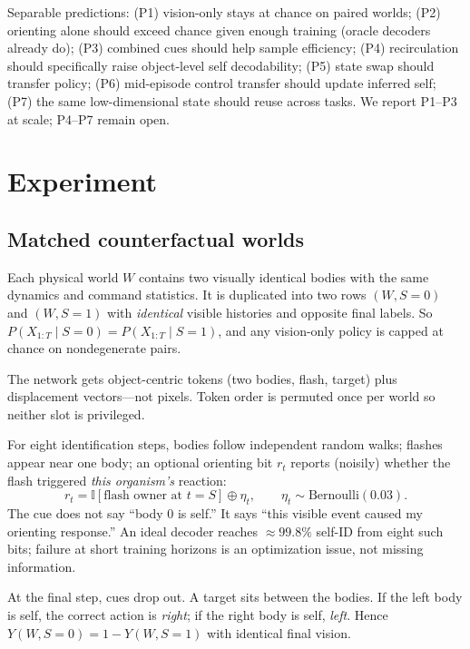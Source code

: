 \documentclass[11pt]{article}
\newcommand{\I}{\mathbb{I}}
\begin{document}
Separable predictions: (P1) vision-only stays at chance on paired worlds; (P2) orienting alone should exceed chance given enough training (oracle decoders already do); (P3) combined cues should help sample efficiency; (P4) recirculation should specifically raise object-level self decodability; (P5) state swap should transfer policy; (P6) mid-episode control transfer should update inferred self; (P7) the same low-dimensional state should reuse across tasks. We report P1--P3 at scale; P4--P7 remain open.

\section{Experiment}

\subsection{Matched counterfactual worlds}

Each physical world $W$ contains two visually identical bodies with the same dynamics and command statistics. It is duplicated into two rows $(W,S=0)$ and $(W,S=1)$ with \emph{identical} visible histories and opposite final labels. So $P(X_{1:T}\mid S=0)=P(X_{1:T}\mid S=1)$, and any vision-only policy is capped at chance on nondegenerate pairs.

The network gets object-centric tokens (two bodies, flash, target) plus displacement vectors---not pixels. Token order is permuted once per world so neither slot is privileged.

For eight identification steps, bodies follow independent random walks; flashes appear near one body; an optional orienting bit $r_t$ reports (noisily) whether the flash triggered \emph{this organism's} reaction:
\begin{equation}
r_t = \I[\text{flash owner at }t=S]\oplus\eta_t, \qquad \eta_t\sim\mathrm{Bernoulli}(0.03).
\end{equation}
The cue does not say ``body 0 is self.'' It says ``this visible event caused my orienting response.'' An ideal decoder reaches $\approx 99.8\%$ self-ID from eight such bits; failure at short training horizons is an optimization issue, not missing information.

At the final step, cues drop out. A target sits between the bodies. If the left body is self, the correct action is \emph{right}; if the right body is self, \emph{left}. Hence $Y(W,S=0)=1-Y(W,S=1)$ with identical final vision.
\end{document}
